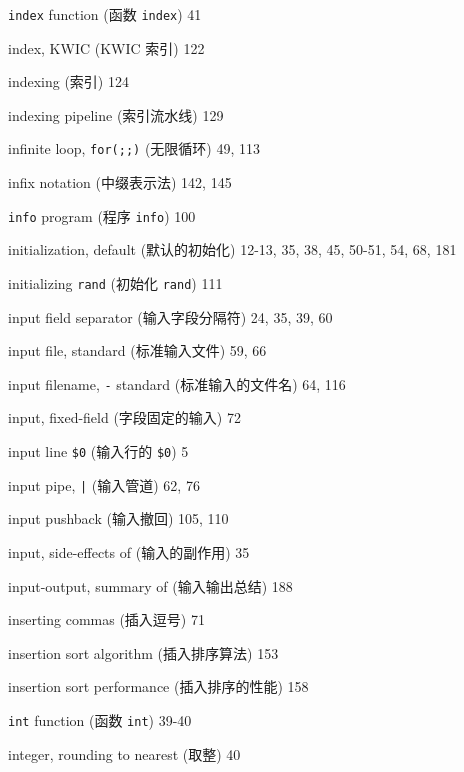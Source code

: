 \begin{multicols}{2}
\hangindent=2pc  \verb'index' function (函数 \verb'index') 41

\hangindent=2pc  index, KWIC (KWIC 索引) 122

\hangindent=2pc  indexing (索引) 124

\hangindent=2pc  indexing pipeline (索引流水线) 129

\hangindent=2pc  infinite loop, \verb'for(;;)' (无限循环) 49, 113

\hangindent=2pc  infix notation (中缀表示法) 142, 145

\hangindent=2pc  \verb'info' program (程序 \verb'info') 100

\hangindent=2pc  initialization, default (默认的初始化)
12-13, 35, 38, 45, 50-51, 54, 68, 181

\hangindent=2pc  initializing \verb'rand' (初始化 \verb'rand') 111

\hangindent=2pc  input field separator (输入字段分隔符) 24, 35, 39, 60

\hangindent=2pc  input file, standard (标准输入文件) 59, 66

\hangindent=2pc  input filename, \verb'-' standard
(标准输入的文件名) 64, 116

\hangindent=2pc  input, fixed-field (字段固定的输入) 72

\hangindent=2pc  input line \verb'$0' (输入行的 \verb'$0') 5

\hangindent=2pc  input pipe, \verb'|' (输入管道) 62, 76

\hangindent=2pc  input pushback (输入撤回) 105, 110

\hangindent=2pc  input, side-effects of (输入的副作用) 35

\hangindent=2pc  input-output, summary of (输入输出总结) 188

\hangindent=2pc  inserting commas (插入逗号) 71

\hangindent=2pc  insertion sort algorithm (插入排序算法) 153

\hangindent=2pc  insertion sort performance (插入排序的性能) 158

\hangindent=2pc  \verb'int' function (函数 \verb'int') 39-40

\hangindent=2pc  integer, rounding to nearest (取整) 40


\end{multicols}
